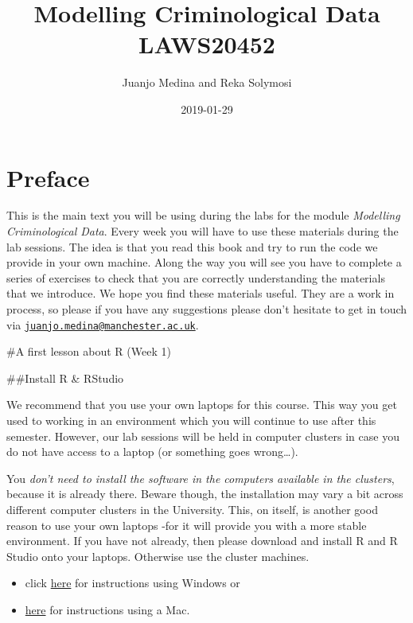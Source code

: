 \documentclass[]{book}
\title{Modelling Criminological Data LAWS20452}
\author{Juanjo Medina and Reka Solymosi}
\date{2019-01-29}
\providecommand{\tightlist}{%
  \setlength{\itemsep}{0pt}\setlength{\parskip}{0pt}}
\theoremstyle{definition}
\theoremstyle{definition}
\theoremstyle{definition}
\theoremstyle{remark}
\begin{document}
\maketitle

{
\setcounter{tocdepth}{1}
\tableofcontents
}
\hypertarget{preface}{%
\chapter*{Preface}\label{preface}}

This is the main text you will be using during the labs for the module
\emph{Modelling Criminological Data}. Every week you will have to use
these materials during the lab sessions. The idea is that you read this
book and try to run the code we provide in your own machine. Along the
way you will see you have to complete a series of exercises to check
that you are correctly understanding the materials that we introduce. We
hope you find these materials useful. They are a work in process, so
please if you have any suggestions please don't hesitate to get in touch
via
\href{mailto:juanjo.medina@manchester.ac.uk}{\nolinkurl{juanjo.medina@manchester.ac.uk}}.

\#A first lesson about R (Week 1)

\#\#Install R \& RStudio

We recommend that you use your own laptops for this course. This way you
get used to working in an environment which you will continue to use
after this semester. However, our lab sessions will be held in computer
clusters in case you do not have access to a laptop (or something goes
wrong\ldots{}).

You \emph{don't need to install the software in the computers available
in the clusters}, because it is already there. Beware though, the
installation may vary a bit across different computer clusters in the
University. This, on itself, is another good reason to use your own
laptops -for it will provide you with a more stable environment. If you
have not already, then please download and install R and R Studio onto
your laptops. Otherwise use the cluster machines.

\begin{itemize}
\tightlist
\item
  click \href{https://www.youtube.com/watch?v=eD07NznguA4}{here} for
  instructions using Windows or
\item
  \href{https://www.youtube.com/watch?v=cX532N_XLIs\&list=PLqzoL9-eJTNDw71zWePXyHx3_cm_fMP8S}{here}
  for instructions using a Mac.
\end{itemize}
\end{document}

